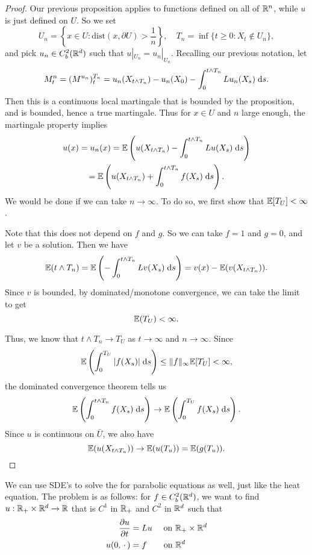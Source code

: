 \documentclass[a4paper]{article}
\begin{document}
\begin{proof}
  Our previous proposition applies to functions defined on all of $\mathbb{R}^n$, while $u$ is just defined on $U$. So we set
  \[
    U_n = \left\{x \in U: \mathrm{dist}(x, \partial U) > \frac{1}{n}\right\},\quad T_n = \inf \{ t \geq 0 : X_t \not \in U_n\},
  \]
  and pick $u_n \in C_b^2(\mathbb{R}^d)$ such that $u|_{U_n} = u_n|_{U_n}$. Recalling our previous notation, let
  \[
    M^n_t = (M^{u_n})^{T_n}_t = u_n(X_{t \wedge T_n}) - u_n(X_0) - \int_0^{t \wedge T_n} Lu_n(X_s)\;\mathrm{d} s.
  \]
  Then this is a continuous local martingale that is bounded by the proposition, and is bounded, hence a true martingale. Thus for $x \in U$ and $n$ large enough, the martingale property implies
  \begin{multline*}
    u(x) = u_n(x) =\mathbb{E} \left(u(X_{t \wedge T_n}) - \int_0^{t \wedge T_n} Lu(X_s)\;\mathrm{d} s\right) \\
    = \mathbb{E} \left(u(X_{t \wedge T_n}) + \int_0^{t \wedge T_n} f(X_s)\;\mathrm{d} s\right).
  \end{multline*}
  We would be done if we can take $n \to \infty$. To do so, we first show that $\mathbb{E} [T_U] < \infty$.

  Note that this does not depend on $f$ and $g$. So we can take $f = 1$ and $g = 0$, and let $v$ be a solution. Then we have
  \[
    \mathbb{E} (t \wedge T_n) = \mathbb{E} \left(- \int_0^{t \wedge T_n} Lv(X_s)\;\mathrm{d} s\right) = v(x) - \mathbb{E}(v(X_{t \wedge T_n})).
  \]
  Since $v$ is bounded, by dominated/monotone convergence, we can take the limit to get
  \[
    \mathbb{E} (T_U) < \infty.
  \]

  Thus, we know that $t \wedge T_n \to T_U$ as $t \to \infty$ and $n \to \infty$. Since
  \[
    \mathbb{E} \left(\int_0^{T_U} |f(X_s)|\;\mathrm{d} s\right) \leq \|f\|_\infty \mathbb{E}[T_U] < \infty,
  \]
  the dominated convergence theorem tells us
  \[
    \mathbb{E} \left(\int_0^{t \wedge T_n} f(X_s)\;\mathrm{d} s \right) \to \mathbb{E} \left(\int_0^{T_U} f(X_s)\;\mathrm{d} s\right).
  \]
  Since $u$ is continuous on $\bar{U}$, we also have
  \[
    \mathbb{E} (u(X_{t \wedge T_n})) \to \mathbb{E}(u(T_u)) = \mathbb{E}(g(T_u)).\qedhere
  \]
\end{proof}

We can use SDE's to solve the  for parabolic equations as well, just like the heat equation. The problem is as follows: for $f \in C_b^2(\mathbb{R}^d)$, we want to find $u: \mathbb{R}_+ \times \mathbb{R}^d \to \mathbb{R}$ that is $C^1$ in $\mathbb{R}_+$ and $C^2$ in $\mathbb{R}^d$ such that
\begin{align*}
  \frac{\partial u}{\partial t} &= Lu \quad \text{ on }\mathbb{R}_+ \times \mathbb{R}^d\\
  u(0, \,\cdot\,) &= f\hphantom{L} \quad \text{ on }\mathbb{R}^d
\end{align*}
\end{document}
